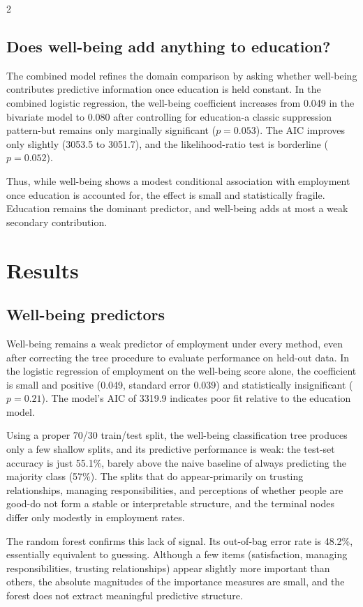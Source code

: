 \documentclass[
  11pt,
]{article}
\begin{document}
\begin{multicols}{2}
\subsection{Does well-being add anything to education?}

The combined model refines the domain comparison by asking whether well-being contributes predictive information once education is held constant. In the combined logistic regression, the well-being coefficient increases from 0.049 in the bivariate model to 0.080 after controlling for education-a classic suppression pattern-but remains only marginally significant ($p = 0.053$). The AIC improves only slightly (3053.5 to 3051.7), and the likelihood-ratio test is borderline ($p = 0.052$).

Thus, while well-being shows a modest conditional association with employment once education is accounted for, the effect is small and statistically fragile. Education remains the dominant predictor, and well-being adds at most a weak secondary contribution.


\section{Results}

\subsection{Well-being predictors}

Well-being remains a weak predictor of employment under every method, even after correcting the tree procedure to evaluate performance on held-out data. In the logistic regression of employment on the well-being score alone, the coefficient is small and positive (0.049, standard error 0.039) and statistically insignificant ($p = 0.21$). The model's AIC of 3319.9 indicates poor fit relative to the education model.

Using a proper 70/30 train/test split, the well-being classification tree produces only a few shallow splits, and its predictive performance is weak: the test-set accuracy is just 55.1\%, barely above the naive baseline of always predicting the majority class (57\%). The splits that do appear-primarily on trusting relationships, managing responsibilities, and perceptions of whether people are good-do not form a stable or interpretable structure, and the terminal nodes differ only modestly in employment rates.

The random forest confirms this lack of signal. Its out-of-bag error rate is 48.2\%, essentially equivalent to guessing. Although a few items (satisfaction, managing responsibilities, trusting relationships) appear slightly more important than others, the absolute magnitudes of the importance measures are small, and the forest does not extract meaningful predictive structure.


\end{multicols}
\end{document}
